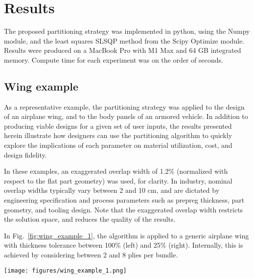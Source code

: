 \section{Results}
\label{sec_results}

The proposed partitioning strategy was implemented in python, using the Numpy module, and the least squares SLSQP method from the Scipy Optimize module. Results were produced on a MacBook Pro with M1 Max and 64 GB integrated memory. Compute time for each experiment was on the order of seconds.

\subsection{Wing example}
As a representative example, the partitioning strategy was applied to the design of an airplane wing, and to the body panels of an armored vehicle. In addition to producing viable designs for a given set of user inputs, the results presented herein illustrate how designers can use the partitioning algorithm to quickly explore the implications of each parameter on material utilization, cost, and design fidelity. 

In these examples, an exaggerated overlap width of 1.2\% (normalized with respect to the flat part geometry) was used, for clarity. In industry, nominal overlap widths typically vary between 2 and 10 cm, and are dictated by engineering specification and process parameters such as prepreg thickness, part geometry, and tooling design. Note that the exaggerated overlap width restricts the solution space, and reduces the quality of the results.

In Fig.~\ref{fig:wing_example_1}, the algorithm is applied to a generic airplane wing with thickness tolerance between 100\% (left) and 25\% (right). Internally, this is achieved by considering between 2 and 8 plies per bundle. 

\begin{figure*}[h]
    \centering
    \texttt{[image: figures/wing\_example\_1.png]}
    \caption{Airplane wing and seam patterns obtained for bundles of $m =$ 4, 6, and 8 plies, with fiber orientations as shown. The prepreg spool width $w_s$ and overlap width $w_{l}$ were 0.3 and 1.2\%, respectively, normalized with respect to the wing length. Performance in terms of laminate thickness variation, average ply width, and the number of explored nodes are plotted on the right.}
    \label{fig:wing_example_1}
\end{figure*}

